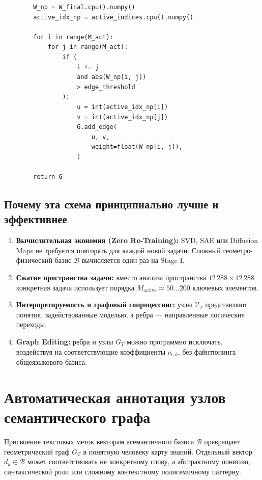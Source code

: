 \documentclass[11pt,a4paper]{article}
\begin{document}
\begin{lstlisting}
        W_np = W_final.cpu().numpy()
        active_idx_np = active_indices.cpu().numpy()

        for i in range(M_act):
            for j in range(M_act):
                if (
                    i != j
                    and abs(W_np[i, j])
                    > edge_threshold
                ):
                    u = int(active_idx_np[i])
                    v = int(active_idx_np[j])
                    G.add_edge(
                        u, v,
                        weight=float(W_np[i, j]),
                    )

        return G
\end{lstlisting}

\fi
\subsection*{Почему эта схема принципиально лучше и эффективнее}

\begin{enumerate}
    \item \textbf{Вычислительная экономия (Zero Re-Training):} SVD, SAE или Diffusion Maps не требуется повторять для каждой новой задачи. Сложный геометро-физический базис $\mathcal{B}$ вычисляется один раз на Stage I.
    \item \textbf{Сжатие пространства задачи:} вместо анализа пространства $12\,288\times12\,288$ конкретная задача использует порядка $M_{\text{active}}\approx50\ldots200$ ключевых элементов.
    \item \textbf{Интерпретируемость и графовый сопроцессинг:} узлы $\mathcal{V}_T$ представляют понятия, задействованные моделью, а ребра — направленные логические переходы.
    \item \textbf{Graph Editing:} ребра и узлы $G_T$ можно программно исключать, воздействуя на соответствующие коэффициенты $c_{t,k}$, без файнтюнинга общеязыкового базиса.
\end{enumerate}

\section{Автоматическая аннотация узлов семантического графа}

Присвоение текстовых меток векторам асемантичного базиса $\mathcal{B}$ превращает геометрический граф $G_T$ в понятную человеку карту знаний. Отдельный вектор $d_k\in\mathcal{B}$ может соответствовать не конкретному слову, а абстрактному понятию, синтаксической роли или сложному контекстному полисемичному паттерну.
\end{document}
